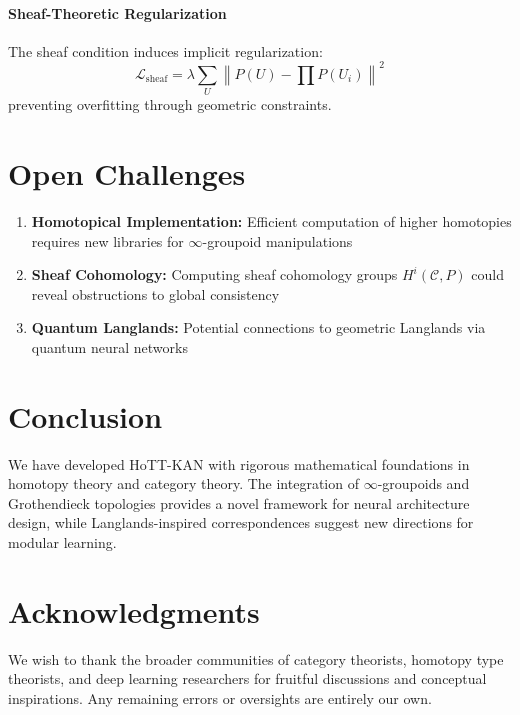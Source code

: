 \documentclass{article}
\begin{document}
\paragraph{Sheaf-Theoretic Regularization} The sheaf condition induces implicit regularization:
\begin{equation}
    \mathcal{L}_{\text{sheaf}} = \lambda \sum_U \left\| P(U) - \prod P(U_i) \right\|^2
\end{equation}
preventing overfitting through geometric constraints.

\section{Open Challenges}
\label{sec:open_challenges}

\begin{enumerate}
    \item \textbf{Homotopical Implementation:} Efficient computation of higher homotopies requires new libraries for $\infty$-groupoid manipulations
    \item \textbf{Sheaf Cohomology:} Computing sheaf cohomology groups $H^i(\mathcal{C}, P)$ could reveal obstructions to global consistency
    \item \textbf{Quantum Langlands:} Potential connections to geometric Langlands via quantum neural networks
\end{enumerate}

\section{Conclusion}
\label{sec:conclusion}

We have developed HoTT-KAN with rigorous mathematical foundations in homotopy theory and category theory. The integration of $\infty$-groupoids and Grothendieck topologies provides a novel framework for neural architecture design, while Langlands-inspired correspondences suggest new directions for modular learning.

\section*{Acknowledgments}
We wish to thank the broader communities of category theorists, homotopy type theorists, and deep learning researchers for fruitful discussions and conceptual inspirations. Any remaining errors or oversights are entirely our own.



\end{document}
